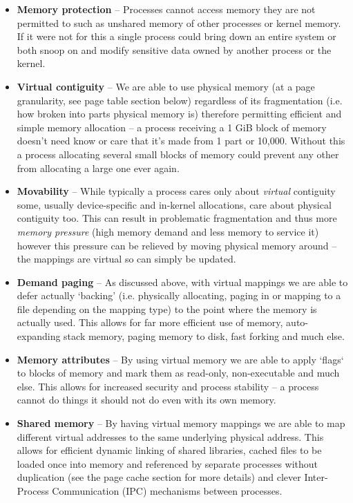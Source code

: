 \begin{itemize}
  \item \textbf{Memory protection} -- Processes cannot access memory they are
    not permitted to such as unshared memory of other processes or kernel
    memory. If it were not for this a single process could bring down an entire
    system or both snoop on and modify sensitive data owned by another process
    or the kernel.
  \item \textbf{Virtual contiguity} -- We are able to use physical memory (at a
    page granularity, see page table section below) regardless of its
    fragmentation (i.e. how broken into parts physical memory is) therefore
    permitting efficient and simple memory allocation -- a process receiving a 1
    GiB block of memory doesn't need know or care that it's made from 1 part or
    10,000. Without this a process allocating several small blocks of memory
    could prevent any other from allocating a large one ever again.
  \item \textbf{Movability} -- While typically a process cares only about
    \emph{virtual} contiguity some, usually device-specific and in-kernel
    allocations, care about physical contiguity too. This can result in
    problematic fragmentation and thus more \emph{memory pressure} (high memory
    demand and less memory to service it) however this pressure can be relieved
    by moving physical memory around -- the mappings are virtual so can simply
    be updated.
  \item \textbf{Demand paging} -- As discussed above, with virtual mappings we
    are able to defer actually `backing' (i.e. physically allocating, paging in
    or mapping to a file depending on the mapping type) to the point where the
    memory is actually used. This allows for far more efficient use of memory,
    auto-expanding stack memory, paging memory to disk, fast forking and much
    else.
  \item \textbf{Memory attributes} -- By using virtual memory we are able to
    apply `flags` to blocks of memory and mark them as read-only, non-executable
    and much else. This allows for increased security and process stability -- a
    process cannot do things it should not do even with its own memory.
  \item \textbf{Shared memory} -- By having virtual memory mappings we are able
    to map different virtual addresses to the same underlying physical
    address. This allows for efficient dynamic linking of shared libraries,
    cached files to be loaded once into memory and referenced by separate
    processes without duplication (see the page cache section for more details)
    and clever Inter-Process Communication (IPC) mechanisms between processes.
\end{itemize}

